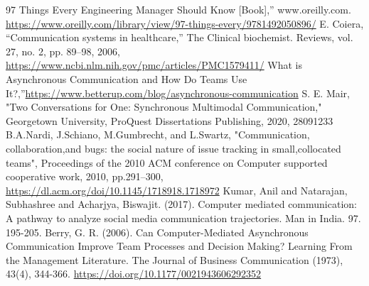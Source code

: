 \documentclass[runningheads]{llncs}
\begin{document}
    \begin{thebibliography}{8}
        97 Things Every Engineering Manager Should Know [Book],” www.oreilly.com. \url{https://www.oreilly.com/library/view/97-things-every/9781492050896/}
        E. Coiera, “Communication systems in healthcare,” The Clinical biochemist. Reviews, vol. 27, no. 2, pp. 89–98, 2006, \url{https://www.ncbi.nlm.nih.gov/pmc/articles/PMC1579411/} 
        What is Asynchronous Communication and How Do Teams Use It?,”\url{https://www.betterup.com/blog/asynchronous-communication}
        S. E. Mair, "Two Conversations for One: Synchronous Multimodal Communication," Georgetown University, ProQuest Dissertations Publishing, 2020, 28091233
        B.A.Nardi, J.Schiano, M.Gumbrecht, and L.Swartz, "Communication, collaboration,and bugs: the social nature of issue tracking in small,collocated teams", Proceedings of the 2010 ACM conference on Computer supported cooperative work, 2010, pp.291–300, \url{https://dl.acm.org/doi/10.1145/1718918.1718972}
        Kumar, Anil and Natarajan, Subhashree and Acharjya, Biswajit. (2017). Computer mediated communication: A pathway to analyze social media communication trajectories. Man in India. 97. 195-205.
        Berry, G. R. (2006). Can Computer-Mediated Asynchronous Communication Improve Team Processes and Decision Making? Learning From the Management Literature. The Journal of Business Communication (1973), 43(4), 344-366. \url{https://doi.org/10.1177/0021943606292352}
    \end{thebibliography}
    
\end{document}
